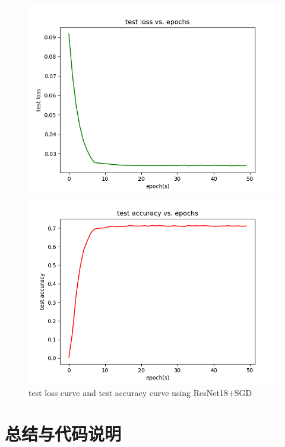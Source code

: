 \documentclass[cn]{elegantbook}
\begin{document}
\begin{figure}[!h]
	\centering
	\begin{minipage}[t]{0.48\textwidth}
		\centering
		\includegraphics[width=\textwidth]{../results/testloss_res_sgd}
	\end{minipage}
	\begin{minipage}[t]{0.48\textwidth}
		\centering
		\includegraphics[width=\textwidth]{../results/testacc_res_sgd}
	\end{minipage}
	\caption{\label{testres_res_sgd}test loss curve and test accuracy curve using ResNet18+SGD}
\end{figure}
\chapter{总结与代码说明}
\end{document}
